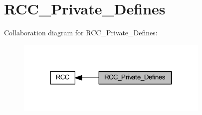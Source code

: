 \hypertarget{group___r_c_c___private___defines}{}\section{R\+C\+C\+\_\+\+Private\+\_\+\+Defines}
\label{group___r_c_c___private___defines}
Collaboration diagram for R\+C\+C\+\_\+\+Private\+\_\+\+Defines\+:
\nopagebreak
\begin{figure}[H]
\begin{center}
\leavevmode
\includegraphics[width=262pt]{group___r_c_c___private___defines}
\end{center}
\end{figure}
